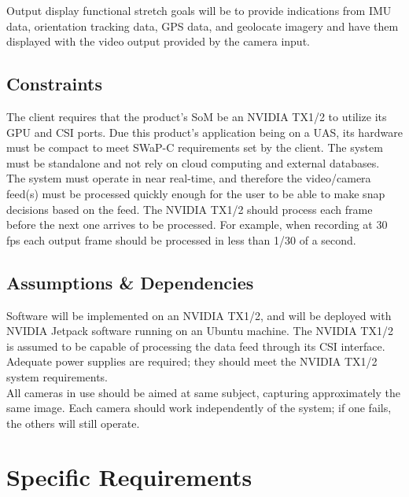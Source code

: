 \documentclass[letterpaper,10pt,serif,draftclsnofoot,onecolumn,compsoc,titlepage]{IEEEtran}
\begin{document}
Output display functional stretch goals will be to provide indications from IMU data, 
orientation tracking data, GPS data, and geolocate imagery and have them displayed 
with the video output provided by the camera input. \\

\subsection{Constraints}

The client requires that the product's SoM be an NVIDIA TX1/2 to utilize its GPU 
and CSI ports. Due this product's application being on a UAS, its hardware must be 
compact to meet SWaP-C requirements set by the client. The system must be standalone 
and not rely on cloud computing and external databases. \\

The system must operate in near real-time, and therefore the video/camera feed(s) must be 
processed quickly enough for the user to be able to make snap decisions based on the feed. The 
NVIDIA TX1/2 should process each frame before the next one arrives to be processed. 
For example, when recording at 30 fps each output frame should be processed in 
less than 1/30 of a second.\\

\subsection{Assumptions \& Dependencies}

Software will be implemented on an NVIDIA TX1/2, and will be deployed with NVIDIA 
Jetpack software running on an Ubuntu machine. The NVIDIA TX1/2 is assumed to be 
capable of processing the data feed through its CSI interface. \\

Adequate power supplies are required; they should meet the NVIDIA TX1/2 system 
requirements. \\

All cameras in use should be aimed at same subject, capturing approximately the same 
image. Each camera should work independently of the system; if one fails, the others 
will still operate.\\

\section{Specific Requirements}
\end{document}
